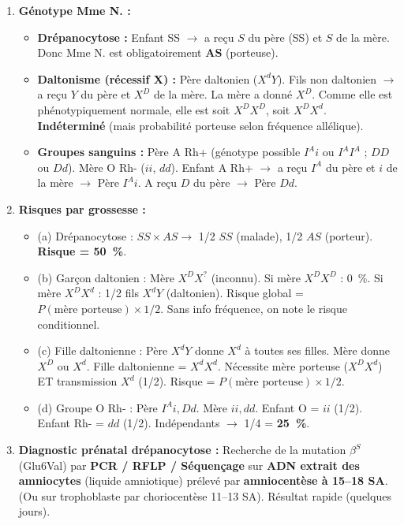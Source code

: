 \documentclass[11pt]{article}
\begin{document}
\begin{corrige}
\begin{enumerate}
    \item \textbf{Génotype Mme N. :}
    \begin{itemize}
        \item \textbf{Drépanocytose :} Enfant SS $\rightarrow$ a reçu $S$ du père (SS) et $S$ de la mère. Donc Mme N. est obligatoirement \textbf{AS} (porteuse).
        \item \textbf{Daltonisme (récessif X) :} Père daltonien ($X^dY$). Fils non daltonien $\rightarrow$ a reçu $Y$ du père et $X^D$ de la mère. La mère a donné $X^D$. Comme elle est phénotypiquement normale, elle est soit $X^D X^D$, soit $X^D X^d$. \textbf{Indéterminé} (mais probabilité porteuse selon fréquence allélique).
        \item \textbf{Groupes sanguins :} Père A Rh+ (génotype possible $I^A i$ ou $I^A I^A$ ; $DD$ ou $Dd$). Mère O Rh- ($ii$, $dd$). Enfant A Rh+ $\rightarrow$ a reçu $I^A$ du père et $i$ de la mère $\rightarrow$ Père $I^A i$. A reçu $D$ du père $\rightarrow$ Père $Dd$.
    \end{itemize}
    \item \textbf{Risques par grossesse :}
    \begin{itemize}
        \item (a) Drépanocytose : $SS \times AS \rightarrow$ 1/2 $SS$ (malade), 1/2 $AS$ (porteur). \textbf{Risque = \SI{50}{\%}}.
        \item (b) Garçon daltonien : Mère $X^D X^?$ (inconnu). Si mère $X^D X^D$ : \SI{0}{\%}. Si mère $X^D X^d$ : 1/2 fils $X^d Y$ (daltonien). Risque global = $P(\text{mère porteuse}) \times 1/2$. Sans info fréquence, on note le risque conditionnel.
        \item (c) Fille daltonienne : Père $X^d Y$ donne $X^d$ à toutes ses filles. Mère donne $X^D$ ou $X^d$. Fille daltonienne = $X^d X^d$. Nécessite mère porteuse ($X^D X^d$) ET transmission $X^d$ (1/2). Risque = $P(\text{mère porteuse}) \times 1/2$.
        \item (d) Groupe O Rh- : Père $I^A i, Dd$. Mère $ii, dd$. Enfant O = $ii$ (1/2). Enfant Rh- = $dd$ (1/2). Indépendants $\rightarrow$ 1/4 = \textbf{\SI{25}{\%}}.
    \end{itemize}
    \item \textbf{Diagnostic prénatal drépanocytose :} Recherche de la mutation $\beta^S$ (Glu6Val) par \textbf{PCR / RFLP / Séquençage} sur \textbf{ADN extrait des amniocytes} (liquide amniotique) prélevé par \textbf{amniocentèse à \num{15}--\num{18} SA}. (Ou sur trophoblaste par choriocentèse \num{11}--\num{13} SA). Résultat rapide (quelques jours).

\end{enumerate}
\end{corrige}
\end{document}
